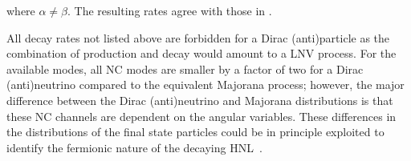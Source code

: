 where $\alpha \neq \beta$.
The resulting rates agree with those in .  
%
%

All decay rates not listed above are forbidden for a Dirac (anti)particle as the combination of production %
and decay would amount to a LNV process.
% 
For the available modes, all NC modes are smaller by a factor of two for a Dirac (anti)neutrino compared %
to the equivalent Majorana process; however, the major difference between the Dirac (anti)neutrino and Majorana distributions %
is that these NC channels are dependent on the angular variables.
These differences in the distributions of the final state particles could be in principle exploited to identify %
the fermionic nature of the decaying HNL~\cite{Balantekin:2018ukw}.





